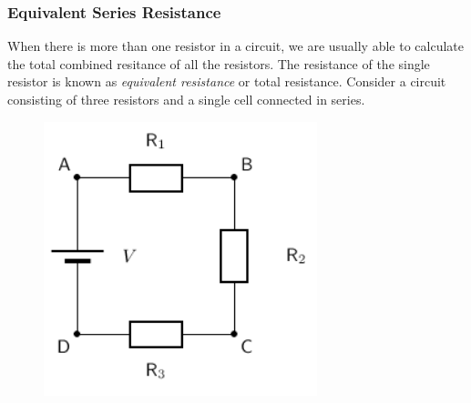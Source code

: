     \addtocounter{footnote}{-0}
    
        \par 

\label{m38776*uid25342}
            \subsubsection{ Equivalent Series Resistance}
            \nopagebreak
            \label{m38776*id63926}When there is more than one resistor in a circuit, we are usually able to calculate the total combined resitance of all the resistors. The resistance of the single resistor is known as \textsl{equivalent resistance} or total resistance.
Consider a circuit consisting of three resistors and a single cell connected in series.\par 
          \label{m38776*id63930}
            
    \setcounter{subfigure}{0}


	\begin{figure}[H] %
    \begin{center}
    \label{m38776*id63934!!!underscore!!!media}\label{m38776*id63934!!!underscore!!!printimage}\includegraphics[width=300px]{col11305.imgs/m38776_PG11C9_007.png} %
        
      \vspace{2pt}
    \vspace{.1in}
    
    \end{center}

 \end{figure}   

    \addtocounter{footnote}{-0}
    
          \par 
          
